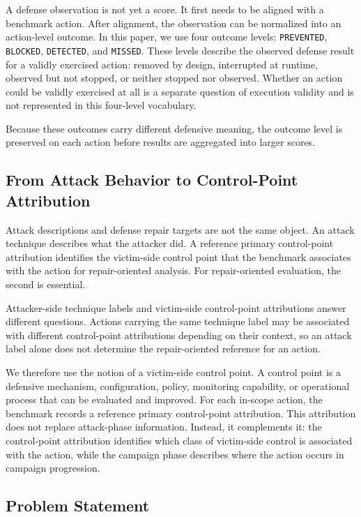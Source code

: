 A defense observation is not yet a score. It first needs to be aligned with a benchmark action. After alignment, the observation can be normalized into an action-level outcome. In this paper, we use four outcome levels: \texttt{PREVENTED}, \texttt{BLOCKED}, \texttt{DETECTED}, and \texttt{MISSED}. These levels describe the observed defense result for a validly exercised action: removed by design, interrupted at runtime, observed but not stopped, or neither stopped nor observed. Whether an action could be validly exercised at all is a separate question of execution validity and is not represented in this four-level vocabulary.

Because these outcomes carry different defensive meaning, the outcome level is preserved on each action before results are aggregated into larger scores.

\subsection{From Attack Behavior to Control-Point Attribution}
\label{subsec:attack-behavior-control-point-failure}

Attack descriptions and defense repair targets are not the same object. An attack technique describes what the attacker did. A reference primary control-point attribution identifies the victim-side control point that the benchmark associates with the action for repair-oriented analysis. For repair-oriented evaluation, the second is essential.

Attacker-side technique labels and victim-side control-point attributions answer different questions. Actions carrying the same technique label may be associated with different control-point attributions depending on their context, so an attack label alone does not determine the repair-oriented reference for an action.

We therefore use the notion of a victim-side control point. A control point is a defensive mechanism, configuration, policy, monitoring capability, or operational process that can be evaluated and improved. For each in-scope action, the benchmark records a reference primary control-point attribution. This attribution does not replace attack-phase information. Instead, it complements it: the control-point attribution identifies which class of victim-side control is associated with the action, while the campaign phase describes where the action occurs in campaign progression.

\subsection{Problem Statement}
\label{subsec:problem-statement}

